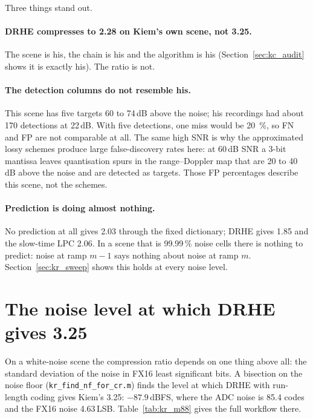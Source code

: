 \noindent
Three things stand out.

\paragraph{DRHE compresses to 2.28 on Kiem's own scene, not 3.25.} The scene
is his, the chain is his and the algorithm is his (Section~\ref{sec:kc_audit}
shows it is exactly his). The ratio is not.

\paragraph{The detection columns do not resemble his.} This scene has five
targets 60 to 74\,dB above the noise; his recordings had about 170 detections
at 22\,dB. With five detections, one miss would be \SI{20}{\percent}, so FN and
FP are not comparable at all. The same high SNR is why the approximated lossy
schemes produce large false-discovery rates here: at 60\,dB SNR a 3-bit mantissa
leaves quantisation spurs in the range--Doppler map that are 20 to 40\,dB above
the noise and are detected as targets. Those FP percentages describe this scene,
not the schemes.

\paragraph{Prediction is doing almost nothing.} No prediction at all gives 2.03
through the fixed dictionary; DRHE gives 1.85 and the slow-time LPC 2.06. In a
scene that is 99.99\,\% noise cells there is nothing to predict: noise at ramp
$m-1$ says nothing about noise at ramp $m$. Section~\ref{sec:kr_sweep}
shows this holds at every noise level.

\section{The noise level at which DRHE gives 3.25}
\label{sec:kr_m88}

On a white-noise scene the compression ratio depends on one thing above all:
the standard deviation of the noise in FX16 least significant bits. A bisection
on the noise floor (\texttt{kr\_find\_nf\_for\_cr.m}) finds the level at which
DRHE with run-length coding gives Kiem's 3.25: $-87.9$\,dBFS, where the ADC
noise is 85.4 codes and the FX16 noise 4.63\,LSB. Table~\ref{tab:kr_m88} gives
the full workflow there.

